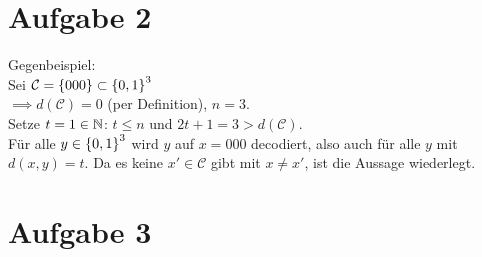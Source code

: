 \section*{Aufgabe 2}
Gegenbeispiel:\\
Sei $\mathcal C = \left\lbrace 000 \right\rbrace\subset\left\lbrace 0, 1 \right\rbrace^3$\\
$\implies d(\mathcal C)=0$ (per Definition), $n=3$.\\
Setze $t=1\in\mathbb{N}$: $t\leq n$ und $2t+1=3>d(\mathcal C)$.\\
Für alle $y\in \left\lbrace 0, 1 \right\rbrace^3$ wird $y$ auf $x=000$ decodiert, also auch für alle $y$ mit $d(x, y)=t$. Da es keine $x'\in\mathcal C$ gibt mit $x\not= x'$, ist die Aussage wiederlegt.

\section*{Aufgabe 3}

